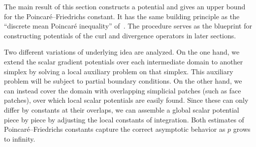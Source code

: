 \documentclass[10pt,letterpaper]{article}
\begin{document}




The main result of this section constructs a potential and gives an upper bound for the Poincar\'e--Friedrichs constant.  
It has the same building principle as the ``discrete mean Poincar\'e inequality'' of~\cite[Lemma~3.7]{Eym_Gal_Her_00}.
The procedure serves as the blueprint for constructing potentials of the curl and divergence operators in later sections. 

Two different variations of underlying idea are analyzed. 
On the one hand, we extend the scalar gradient potentials over each intermediate domain to another simplex by solving a local auxiliary problem on that simplex. This auxiliary problem will be subject to partial boundary conditions. 
On the other hand, we can instead cover the domain with overlapping simplicial patches (such as face patches), over which local scalar potentials are easily found. Since these can only differ by constants at their overlaps, we can assemble a global scalar potential piece by piece by adjusting the local constants of integration. 
Both estimates of Poincar\'e--Friedrichs constants capture the correct asymptotic behavior as $p$ grows to infinity.
\end{document}
